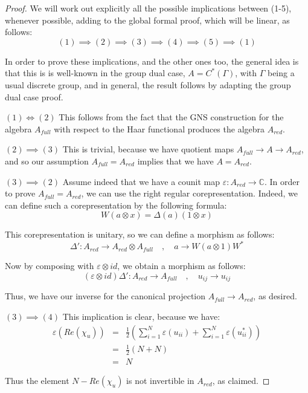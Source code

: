 \documentclass[12pt]{amsbook}
\begin{document}
\begin{proof}
We will work out explicitly all the possible implications between (1-5), whenever possible, adding to the global formal proof, which will be linear, as follows:
$$(1)\implies(2)\implies(3)\implies(4)\implies(5)\implies(1)$$

In order to prove these implications, and the other ones too, the general idea is that this is is well-known in the group dual case, $A=C^*(\Gamma)$, with $\Gamma$ being a usual discrete group, and in general, the result follows by adapting the group dual case proof. 

\medskip

$(1)\iff(2)$ This follows from the fact that the GNS construction for the algebra $A_{full}$ with respect to the Haar functional produces the algebra $A_{red}$.

\medskip

$(2)\implies(3)$ This is trivial, because we have quotient maps $A_{full}\to A\to A_{red}$, and so our assumption $A_{full}=A_{red}$ implies that we have $A=A_{red}$. 

\medskip 

$(3)\implies(2)$ Assume indeed that we have a counit map $\varepsilon:A_{red}\to\mathbb C$. In order to prove $A_{full}=A_{red}$, we can use the right regular corepresentation. Indeed, we can define such a corepresentation by the following formula:
$$W(a\otimes x)=\Delta(a)(1\otimes x)$$

This corepresentation is unitary, so we can define a morphism as follows: 
$$\Delta':A_{red}\to A_{red}\otimes A_{full}\quad,\quad 
a\to W(a\otimes1)W^*$$

Now by composing with $\varepsilon\otimes id$, we obtain a morphism as follows:
$$(\varepsilon\otimes id)\Delta':A_{red}\to A_{full}\quad,\quad 
u_{ij}\to u_{ij}$$

Thus, we have our inverse for the canonical projection $A_{full}\to A_{red}$, as desired.

\medskip

$(3)\implies(4)$ This implication is clear, because we have:
\begin{eqnarray*}
\varepsilon(Re(\chi_u))
&=&\frac{1}{2}\left(\sum_{i=1}^N\varepsilon(u_{ii})+\sum_{i=1}^N\varepsilon(u_{ii}^*)\right)\\
&=&\frac{1}{2}(N+N)\\
&=&N
\end{eqnarray*}

Thus the element $N-Re(\chi_u)$ is not invertible in $A_{red}$, as claimed.


\end{proof}
\end{document}
